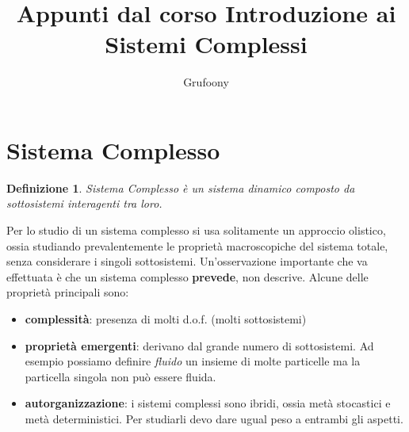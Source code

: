 \documentclass[12pt, a4paper]{article}
\theoremstyle{theorem}
\newtheorem{definition}{Definizione}[section]
\begin{document}
	\title{Appunti dal corso Introduzione ai Sistemi Complessi}
	\author{Grufoony}
	\maketitle
	\section{Sistema Complesso}
		\begin{definition}
			\textit{Sistema Complesso} è un sistema dinamico composto da sottosistemi interagenti tra loro.
		\end{definition}
		Per lo studio di un sistema complesso si usa solitamente un approccio olistico, ossia studiando prevalentemente le proprietà macroscopiche del sistema totale, senza considerare i singoli sottosistemi.
		Un'osservazione importante che va effettuata è che un sistema complesso \textbf{prevede}, non descrive.
		Alcune delle proprietà principali sono:
		\begin{itemize}
			\item \textbf{complessità}: presenza di molti d.o.f. (molti sottosistemi)
			\item \textbf{proprietà emergenti}: derivano dal grande numero di sottosistemi. Ad esempio possiamo definire \textit{fluido} un insieme di molte particelle ma la particella singola non può essere fluida.
			\item \textbf{autorganizzazione}: i sistemi complessi sono ibridi, ossia metà stocastici e metà deterministici. Per studiarli devo dare ugual peso a entrambi gli aspetti.
		\end{itemize}
\end{document}
